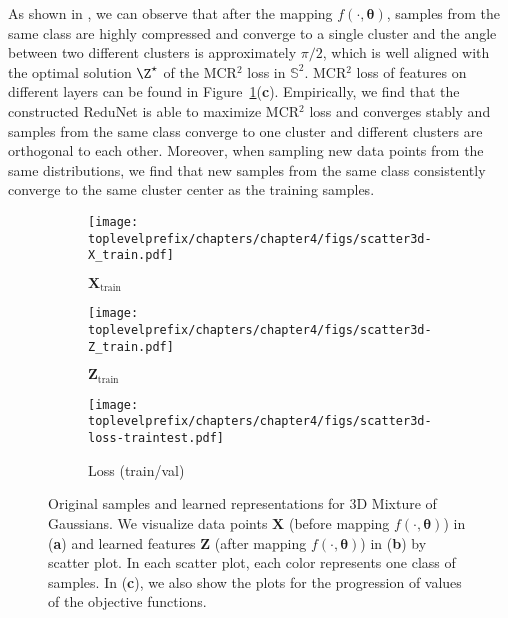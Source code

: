 \documentclass[../../book-main.tex]{subfiles}
\begin{document}
\begin{example}
As shown in , we can observe that after the mapping $f(\cdot, \bm{\theta})$, samples from the same class are highly compressed and converge to a single cluster and the angle between two different clusters is approximately $\pi/2$, which is well aligned with the optimal solution $\Z^{\star}$ of the MCR$^2$ loss in $\mathbb{S}^2$. 
MCR$^2$ loss of features on different layers can be found in Figure~\ref{fig:redu-3d-gaussian-diagram}(\textbf{c}). Empirically, we find that the constructed ReduNet is able to maximize MCR$^2$ loss and converges stably and samples from the same class converge to one cluster and different clusters are orthogonal to each other. 
Moreover, when sampling new data points from the same distributions, we find that new samples from the same class consistently converge to the same cluster center as the training samples. 
\begin{figure}[t]
    \begin{subfigure}[t]{0.32\textwidth}
        \centering 
        \texttt{[image: \\toplevelprefix/chapters/chapter4/figs/scatter3d-X\_train.pdf]}\vspace{-0.1in}
        \caption{$\bm{X}_{\text{train}}$}
    \end{subfigure}
    \hfill
    \begin{subfigure}[t]{0.32\textwidth}
        \centering 
        \texttt{[image: \\toplevelprefix/chapters/chapter4/figs/scatter3d-Z\_train.pdf]}\vspace{-0.1in}
        \caption{$\bm{Z}_{\text{train}}$}
    \end{subfigure}
    \hfill
    \begin{subfigure}[t]{0.32\textwidth}
        \centering 
        \texttt{[image: \\toplevelprefix/chapters/chapter4/figs/scatter3d-loss-traintest.pdf]}\vspace{-0.1in}
        \caption{Loss (train/val)}
    \end{subfigure}
    \vspace{-0.1in}
    \caption{\small Original samples  and learned representations for 3D Mixture of Gaussians. We visualize data points $\bm{X}$ (before mapping $f(\cdot, \bm{\theta})$) in (\textbf{a}) and learned features $\bm{Z}$ (after mapping $f(\cdot, \bm{\theta})$) in (\textbf{b}) by scatter plot. In each scatter plot, each color represents one class of samples. In (\textbf{c}), we also show the plots for the progression of values of the objective functions.}
    \label{fig:redu-3d-gaussian-diagram}
\end{figure}

\end{example}
\end{document}
